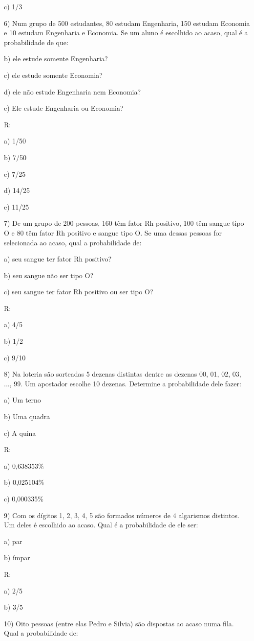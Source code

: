 c) 1/3

6) Num grupo de 500 estudantes, 80 estudam Engenharia, 150 estudam
Economia e 10 estudam Engenharia e Economia. Se um aluno é escolhido ao
acaso, qual é a probabilidade de que:

b) ele estude somente Engenharia?

c) ele estude somente Economia?

d) ele não estude Engenharia nem Economia?

e) Ele estude Engenharia ou Economia?

R:

a) 1/50

b) 7/50

c) 7/25

d) 14/25

e) 11/25

7) De um grupo de 200 pessoas, 160 têm fator Rh positivo, 100 têm sangue
tipo O e 80 têm fator Rh positivo e sangue tipo O. Se uma dessas pessoas
for selecionada ao acaso, qual a probabilidade de:

a) seu sangue ter fator Rh positivo?

b) seu sangue não ser tipo O?

c) seu sangue ter fator Rh positivo ou ser tipo O?

R:

a) 4/5

b) 1/2

c) 9/10

8) Na loteria são sorteadas 5 dezenas distintas dentre as dezenas 00,
01, 02, 03, ..., 99. Um apostador escolhe 10 dezenas. Determine a
probabilidade dele fazer:

a) Um terno

b) Uma quadra

c) A quina

R:

a) 0,638353\%

b) 0,025104\%

c) 0,000335\%

9) Com os dígitos 1, 2, 3, 4, 5 são formados números de 4 algarismos
distintos. Um deles é escolhido ao acaso. Qual é a probabilidade de ele
ser:

a) par

b) ímpar

R:

a) 2/5

b) 3/5

10) Oito pessoas (entre elas Pedro e Silvia) são dispostas ao acaso numa
fila. Qual a probabilidade de:

